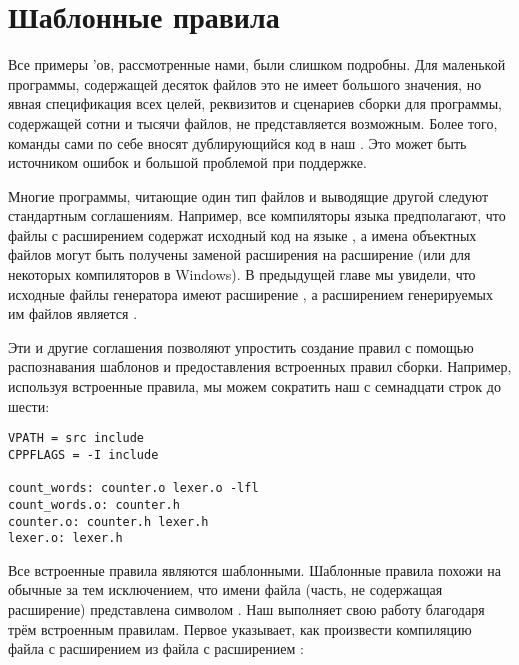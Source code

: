 \section{Шаблонные правила}
\label{sec:pattern_rules}

Все примеры \Makefile{}'ов, рассмотренные нами, были слишком подробны.
Для маленькой программы, содержащей десяток файлов это не имеет
большого значения, но явная спецификация всех целей, реквизитов и
сценариев сборки для программы, содержащей сотни и тысячи файлов, не
представляется возможным. Более того, команды сами по себе вносят
дублирующийся код в наш \Makefile{}. Это может быть источником ошибок
и большой проблемой при поддержке.

Многие программы, читающие один тип файлов и выводящие другой следуют
стандартным соглашениям. Например, все компиляторы языка \Clang{}
предполагают, что файлы с расширением  содержат исходный
код на языке \Clang{}, а имена объектных файлов могут быть получены
заменой расширения  на расширение  (или
 для некоторых компиляторов в Windows). В предыдущей
главе мы увидели, что исходные файлы генератора  имеют
расширение , а расширением генерируемых им файлов
является .

Эти и другие соглашения позволяют \GNUmake{} упростить создание правил
с помощью распознавания шаблонов и предоставления встроенных правил
сборки. Например, используя встроенные правила, мы можем сократить наш
\Makefile{} с семнадцати строк до шести:

{\footnotesize
\begin{verbatim}
VPATH = src include
CPPFLAGS = -I include

count_words: counter.o lexer.o -lfl
count_words.o: counter.h
counter.o: counter.h lexer.h
lexer.o: lexer.h
\end{verbatim}
}

Все встроенные правила являются шаблонными. Шаблонные правила похожи
на обычные за тем исключением, что  имени файла
(часть, не содержащая расширение) представлена символом \command{\%}.
Наш \Makefile{} выполняет свою работу благодаря трём встроенным
правилам. Первое указывает, как произвести компиляцию файла с
расширением  из файла с расширением :

